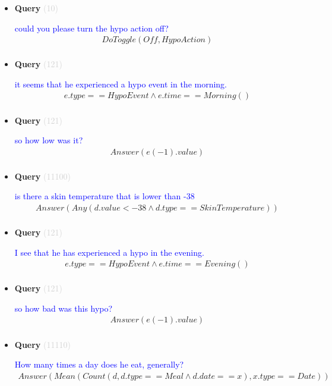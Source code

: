 \documentclass[11pt]{article}
\newcommand{\key}[1]{\textcolor{lightgray}{#1}}
\newcounter{CQuery}
\begin{document}
\begin{itemize}
\item
\textbf{Query\theCQuery} \key{(10)} \addtocounter{CQuery}{1}
\textcolor{blue}{ could you please turn the hypo action off? }
\begin{multline*}
DoToggle(Off, HypoAction) \\ 
\end{multline*}


\item
\textbf{Query\theCQuery} \key{(121)} \addtocounter{CQuery}{1}
\textcolor{blue}{ it seems that he experienced a hypo event in the morning. }
\begin{multline*}
e.type==HypoEvent \wedge e.time==Morning() \\ 
\end{multline*}


\item
\textbf{Query\theCQuery} \key{(121)} \addtocounter{CQuery}{1}
\textcolor{blue}{ so how low was it? }
\begin{multline*}
Answer(e(-1).value) \\ 
\end{multline*}


\item
\textbf{Query\theCQuery} \key{(11100)} \addtocounter{CQuery}{1}
\textcolor{blue}{ is there a skin temperature that is lower than -38 }
\begin{multline*}
Answer(Any(d.value<-38 \wedge d.type==SkinTemperature)) \\ 
\end{multline*}


\item
\textbf{Query\theCQuery} \key{(121)} \addtocounter{CQuery}{1}
\textcolor{blue}{ I see that he has experienced a hypo in the evening. }
\begin{multline*}
e.type==HypoEvent \wedge e.time==Evening() \\ 
\end{multline*}


\item
\textbf{Query\theCQuery} \key{(121)} \addtocounter{CQuery}{1}
\textcolor{blue}{ so how bad was this hypo? }
\begin{multline*}
Answer(e(-1).value) \\ 
\end{multline*}


\item
\textbf{Query\theCQuery} \key{(11110)} \addtocounter{CQuery}{1}
\textcolor{blue}{ How many times a day does he eat, generally? }
\begin{multline*}
Answer(Mean(Count(d, d.type==Meal \wedge d.date==x), x.type==Date)) \\ 
\end{multline*}



\end{itemize}
\end{document}
